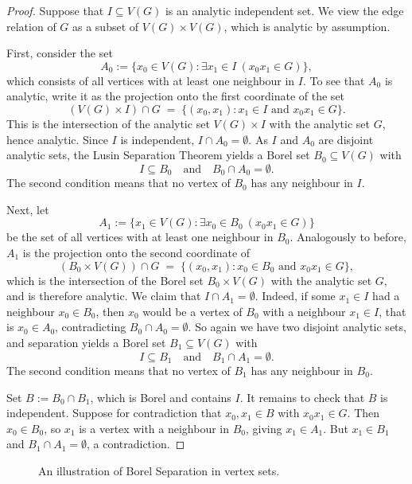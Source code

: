 \begin{proof}
    Suppose that $I \subseteq V(G)$ is an analytic independent set.
    We view the edge relation of $G$ as a subset of $V(G)\times V(G)$, which is analytic by assumption.

    First, consider the set $$A_0 := \{x_0\in V(G):\exists x_1\in I\ (x_0x_1\in G)\},$$
    which consists of all vertices with at least one neighbour in $I$.
    To see that $A_0$ is analytic, write it as the projection onto the first coordinate of the set $$(V(G)\times I)\cap G \;=\; \{(x_0,x_1): x_1\in I \text{ and } x_0x_1\in G\}.$$
    This is the intersection of the analytic set $V(G)\times I$ with the analytic set $G$, hence analytic.
    Since $I$ is independent, $I\cap A_0=\emptyset$.
    As $I$ and $A_0$ are disjoint analytic sets, the Lusin Separation Theorem \cite[Theorem~14.7]{Kechris_1995_DescriptiveSetTheory} yields a Borel set $B_0\subseteq V(G)$ with $$I\subseteq B_0 \quad\text{and}\quad B_0\cap A_0=\emptyset.$$
    The second condition means that no vertex of $B_0$ has any neighbour in $I$.

    Next, let $$A_1 := \{x_1\in V(G):\exists x_0\in B_0\ (x_0x_1\in G)\}$$
    be the set of all vertices with at least one neighbour in $B_0$.
    Analogously to before, $A_1$ is the projection onto the second coordinate of
    $$(B_0\times V(G))\cap G \;=\; \{(x_0,x_1): x_0\in B_0 \text{ and } x_0x_1\in G\},$$
    which is the intersection of the Borel set $B_0\times V(G)$ with the analytic set $G$, and is therefore analytic.
    We claim that $I\cap A_1=\emptyset$.
    Indeed, if some $x_1\in I$ had a neighbour $x_0\in B_0$, then $x_0$ would be a vertex of $B_0$ with a neighbour $x_1\in I$, that is $x_0\in A_0$, contradicting $B_0\cap A_0=\emptyset$.
    So again we have two disjoint analytic sets, and separation yields a Borel set $B_1\subseteq V(G)$ with $$I\subseteq B_1 \quad\text{and}\quad B_1\cap A_1=\emptyset.$$
    The second condition means that no vertex of $B_1$ has any neighbour in $B_0$.

    Set $B:=B_0\cap B_1$, which is Borel and contains $I$.
    It remains to check that $B$ is independent.
    Suppose for contradiction that $x_0,x_1\in B$ with $x_0x_1\in G$.
    Then $x_0\in B_0$, so $x_1$ is a vertex with a neighbour in $B_0$, giving $x_1\in A_1$.
    But $x_1\in B_1$ and $B_1\cap A_1=\emptyset$, a contradiction.
\end{proof}

\begin{figure}[ht]
    \centering
    
    \caption{An illustration of Borel Separation in vertex sets.}
    \label{fig:Borel_separation}
\end{figure}

